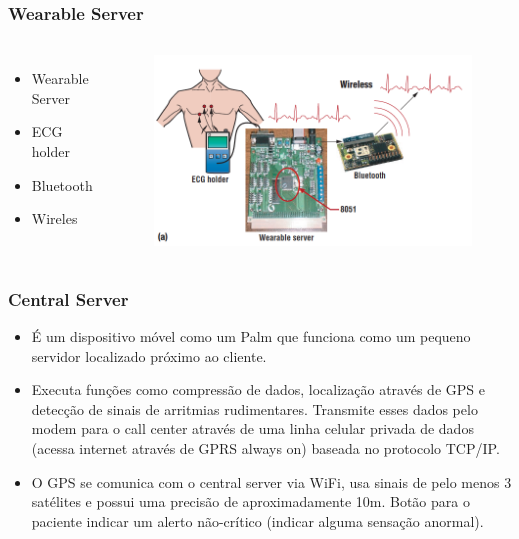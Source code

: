 \documentclass{beamer}
\begin{document}
\begin{frame}
\frametitle{Wearable Server}

\begin{columns}[c] %

	\begin{itemize}
		\item Wearable Server
		\item ECG holder
		\item Bluetooth
		\item Wireles
	\end{itemize}

	\begin{figure}
		\includegraphics[width=1\linewidth]{figura1-wearable-server.png}
	\end{figure}

\end{columns}


\end{frame}


\begin{frame}
\frametitle{Central Server}

	\begin{itemize}
		\item É um dispositivo móvel como um Palm que funciona como um pequeno servidor localizado próximo ao cliente. 
		\item Executa funções como compressão de dados, localização através de GPS e detecção de sinais de arritmias rudimentares. Transmite esses dados pelo modem para o call center através de uma linha celular privada de dados (acessa internet através de GPRS always on) baseada no protocolo TCP/IP. 
		\item O GPS se comunica com o central server via WiFi, usa sinais de pelo menos 3 satélites e possui uma precisão de aproximadamente 10m.
		Botão para o paciente indicar um alerto não-crítico (indicar alguma sensação anormal).
	\end{itemize}
\end{frame}
\end{document}

